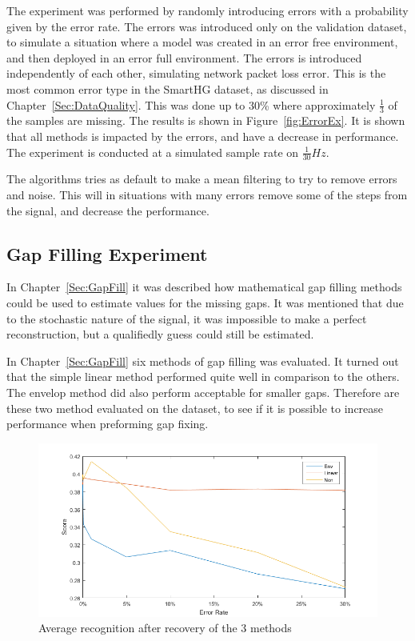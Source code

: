 The experiment was performed by randomly introducing errors with a probability given by the error rate. The errors was introduced only on the validation dataset, to simulate a situation where a model was created in an error free environment, and then deployed in an error full environment. The errors is introduced independently of each other, simulating network packet loss error. This is the most common error type in the SmartHG dataset, as discussed in Chapter~\ref{Sec:DataQuality}.  This was done up to 30\% where approximately $\frac{1}{3}$ of the samples are missing. The results is shown in Figure~\ref{fig:ErrorEx}. It is shown that all methods is impacted by the errors, and have a decrease in performance. The experiment is conducted at a simulated sample rate on $\frac{1}{30} Hz$.

The algorithms tries as default to make a mean filtering to try to remove errors and noise. This will in situations with many errors remove some of the steps from the signal, and decrease the performance.  



\subsection{Gap Filling Experiment}
In Chapter~\ref{Sec:GapFill} it was described how mathematical gap filling methods could be used to estimate values for the missing gaps. It was mentioned that due to the stochastic nature of the signal, it was impossible to make a perfect reconstruction, but a qualifiedly guess could still be estimated.

In Chapter~\ref{Sec:GapFill} six methods of gap filling was evaluated. It turned out that the simple linear method performed quite well in comparison to the others. The envelop method did also perform acceptable for smaller gaps. Therefore are these two method evaluated on the  dataset, to see if it is possible to increase performance when preforming gap fixing. 


\begin{figure}[H]
\centering
\includegraphics[width=1\textwidth]{billeder/EcoRecError.png}
\caption{Average recognition after recovery of the 3 methods}
\label{fig:GER}
\end{figure}

